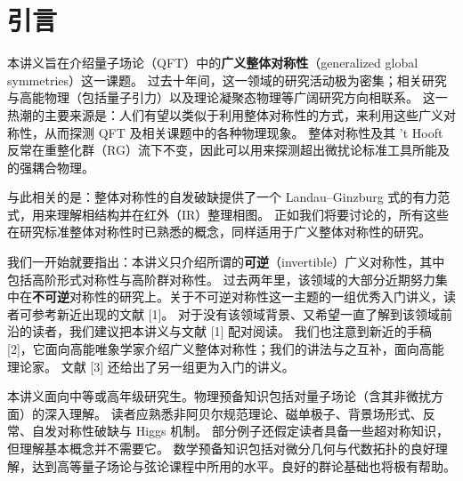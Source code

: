 \section{引言}

本讲义旨在介绍量子场论（QFT）中的\textbf{广义整体对称性}（generalized global symmetries）这一课题。
过去十年间，这一领域的研究活动极为密集；相关研究与高能物理（包括量子引力）以及理论凝聚态物理等广阔研究方向相联系。
这一热潮的主要来源是：人们有望以类似于利用整体对称性的方式，来利用这些广义对称性，从而探测 QFT 及相关课题中的各种物理现象。
整体对称性及其 't Hooft 反常在重整化群（RG）流下不变，因此可以用来探测超出微扰论标准工具所能及的强耦合物理。

与此相关的是：整体对称性的自发破缺提供了一个 Landau--Ginzburg 式的有力范式，用来理解相结构并在红外（IR）整理相图。
正如我们将要讨论的，所有这些在研究标准整体对称性时已熟悉的概念，同样适用于广义整体对称性的研究。

我们一开始就要指出：本讲义只介绍所谓的\textbf{可逆}（invertible）广义对称性，其中包括高阶形式对称性与高阶群对称性。
过去两年里，该领域的大部分近期努力集中在\textbf{不可逆}对称性的研究上。关于不可逆对称性这一主题的一组优秀入门讲义，读者可参考新近出现的文献 [1]。
对于没有该领域背景、又希望一直了解到该领域前沿的读者，我们建议把本讲义与文献 [1] 配对阅读。
我们也注意到新近的手稿 [2]，它面向高能唯象学家介绍广义整体对称性；我们的讲法与之互补，面向高能理论家。
文献 [3] 还给出了另一组更为入门的讲义。

本讲义面向中等或高年级研究生。物理预备知识包括对量子场论（含其非微扰方面）的深入理解。
读者应熟悉非阿贝尔规范理论、磁单极子、背景场形式、反常、自发对称性破缺与 Higgs 机制。
部分例子还假定读者具备一些超对称知识，但理解基本概念并不需要它。
数学预备知识包括对微分几何与代数拓扑的良好理解，达到高等量子场论与弦论课程中所用的水平。良好的群论基础也将极有帮助。

